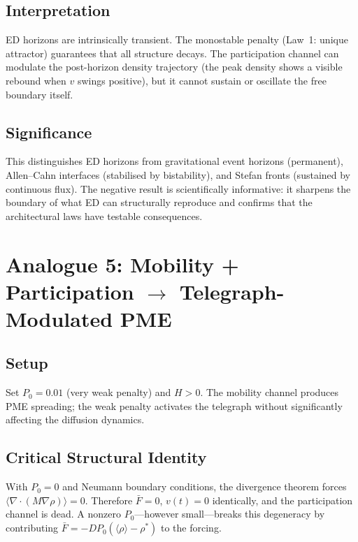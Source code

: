 \documentclass[11pt]{article}
\begin{document}
\subsection{Interpretation}

ED horizons are intrinsically transient. The monostable penalty (Law~1: unique attractor) guarantees that all structure decays. The participation channel can modulate the post-horizon density trajectory (the peak density shows a visible rebound when \(v\) swings positive), but it cannot sustain or oscillate the free boundary itself.

\subsection{Significance}

This distinguishes ED horizons from gravitational event horizons (permanent), Allen--Cahn interfaces (stabilised by bistability), and Stefan fronts (sustained by continuous flux). The negative result is scientifically informative: it sharpens the boundary of what ED can structurally reproduce and confirms that the architectural laws have testable consequences.

\section{Analogue 5: Mobility + Participation \texorpdfstring{$\to$}{->} Telegraph-Modulated PME}

\subsection{Setup}

Set \(P_0 = 0.01\) (very weak penalty) and \(H > 0\). The mobility channel produces PME spreading; the weak penalty activates the telegraph without significantly affecting the diffusion dynamics.

\subsection{Critical Structural Identity}

With \(P_0 = 0\) and Neumann boundary conditions, the divergence theorem forces \(\langle\nabla\!\cdot\!(M\nabla\rho)\rangle = 0\). Therefore \(\bar{F} = 0\), \(v(t) = 0\) identically, and the participation channel is dead. A nonzero \(P_0\)---however small---breaks this degeneracy by contributing \(\bar{F} = -DP_0(\langle\rho\rangle - \rho^*)\) to the forcing.
\end{document}
